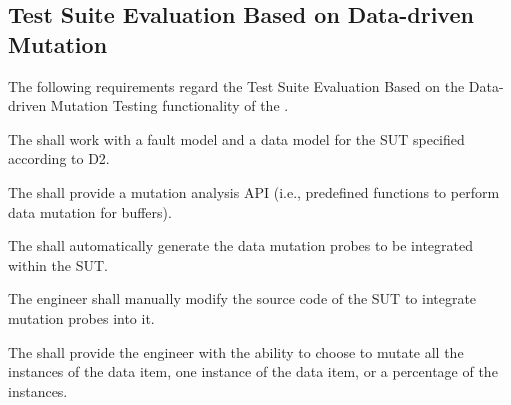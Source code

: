

\subsection{Test Suite Evaluation Based on Data-driven Mutation}
\label{sec:dataDriven}

The following requirements regard the Test Suite Evaluation Based on the Data-driven Mutation Testing functionality of the \FAQAS.



\RQ{} The \FAQAS shall work with a fault model and a data model for the SUT specified according to D2.

\RQ{} The \FAQAS shall provide a mutation analysis API (i.e., predefined functions to perform data mutation for buffers).

\RQ{} The \FAQAS shall automatically generate the data mutation probes to be integrated within the SUT.

\RQ{} The engineer shall manually modify the source code of the SUT to integrate mutation probes into it.




%

\RQ{} The \FAQAS shall provide the engineer with the ability to choose to mutate all the instances of the data item, one instance of the data item, or a percentage of the instances.



